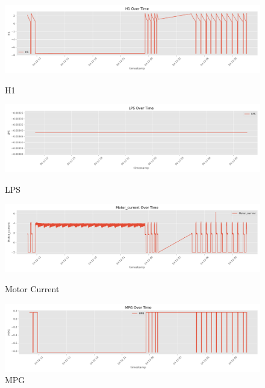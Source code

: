 \documentclass[12pt,letterpaper]{article}
\begin{document}
\begin{figure}[htp]
    \begin{minipage}[b]{0.45\textwidth}
        \centering
        \includegraphics[width=\textwidth]{H1.png}
        \caption*{H1}
    \end{minipage}
    \hfill
    \begin{minipage}[b]{0.45\textwidth}
        \centering
        \includegraphics[width=\textwidth]{LPS.png}
        \caption*{LPS}
    \end{minipage}
    \vspace{0.5em}

    \begin{minipage}[b]{0.45\textwidth}
        \centering
        \includegraphics[width=\textwidth]{Motor_current.png}
        \caption*{Motor Current}
    \end{minipage}
    \hfill
    \begin{minipage}[b]{0.45\textwidth}
        \centering
        \includegraphics[width=\textwidth]{MPG.png}
        \caption*{MPG}
    \end{minipage}
    \vspace{0.5em}


\end{figure}
\end{document}
